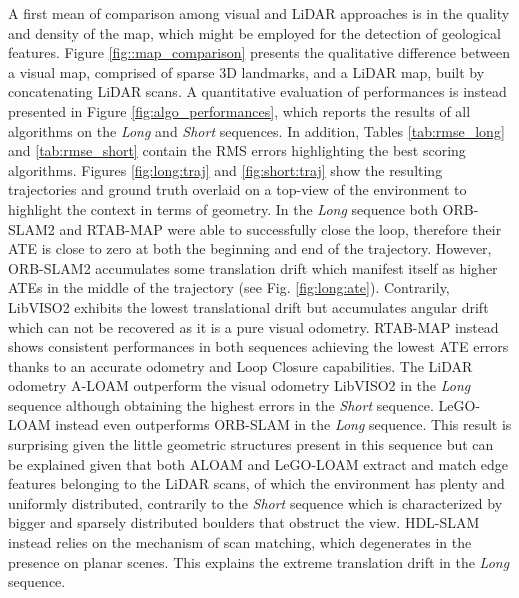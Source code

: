 \documentclass[conference]{IEEEtran}  %
\begin{document}
A first mean of comparison among visual and LiDAR approaches is in the quality and density of the map, which might be employed for the detection of geological features. Figure \ref{fig::map_comparison} presents the qualitative difference between a visual map, comprised of sparse 3D landmarks, and a LiDAR map, built by concatenating LiDAR scans. A quantitative evaluation of performances is instead presented in
Figure \ref{fig:algo_performances}, which reports the results of all algorithms on the \textit{Long} and \textit{Short} sequences. In addition, Tables \ref{tab:rmse_long} and \ref{tab:rmse_short} contain the RMS errors highlighting the best scoring algorithms. Figures \ref{fig:long:traj} and \ref{fig:short:traj} show the resulting trajectories and ground truth overlaid on a top-view of the environment to highlight the context in terms of geometry.
In the \textit{Long} sequence both ORB-SLAM2 and RTAB-MAP were able to successfully close the loop, therefore their ATE is close to zero at both the beginning and end of the trajectory. However, ORB-SLAM2 accumulates some translation drift which manifest itself as higher ATEs in the middle of the trajectory (see Fig. \ref{fig:long:ate}). Contrarily, LibVISO2 exhibits the lowest translational drift but accumulates angular drift which can not be recovered as it is a pure visual odometry. RTAB-MAP instead shows consistent performances in both sequences achieving the lowest ATE errors thanks to an accurate odometry and Loop Closure capabilities. The LiDAR odometry A-LOAM outperform the visual odometry LibVISO2 in the \textit{Long} sequence although obtaining the highest errors in the \textit{Short} sequence. LeGO-LOAM instead even outperforms ORB-SLAM in the \textit{Long} sequence.
This result is surprising given the little geometric structures present in this sequence but can be explained given that both ALOAM and LeGO-LOAM extract and match edge features belonging to the LiDAR scans, of which the environment has plenty and uniformly distributed, contrarily to the \textit{Short} sequence which is characterized by bigger and sparsely distributed boulders that obstruct the view. HDL-SLAM instead relies on the mechanism of scan matching, which degenerates in the presence on planar scenes. This explains the extreme translation drift in the \textit{Long} sequence.
\end{document}
